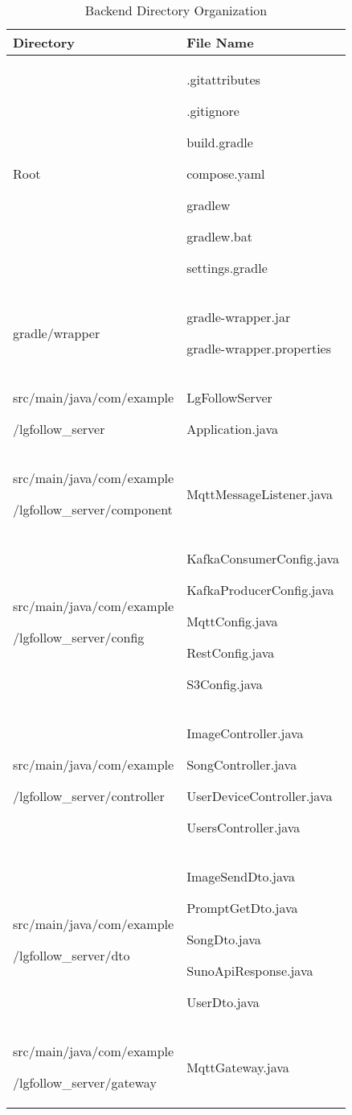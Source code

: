 \documentclass[conference]{IEEEtran}
\begin{document}
\begin{table}[h!]
\caption{Backend Directory Organization}
\def\arraystretch{1.4} \small
    \begin{tabular}{|p{4.1cm}|p{4.1cm}|}
        \hline
        \textbf{Directory} & \textbf{File Name} \\ \hline
        Root & .gitattributes \par .gitignore 
        \par build.gradle
        \par compose.yaml
        \par gradlew \par gradlew.bat \par settings.gradle\\ \hline
        gradle/wrapper& gradle-wrapper.jar \par gradle-wrapper.properties\\ \hline
        src/main/java/com/example  \par /lgfollow\_server & LgFollowServer\par Application.java \\ \hline
        src/main/java/com/example \par /lgfollow\_server/component & MqttMessageListener.java \\ \hline
        src/main/java/com/example \par /lgfollow\_server/config & KafkaConsumerConfig.java \par KafkaProducerConfig.java \par MqttConfig.java \par RestConfig.java \par S3Config.java \\ \hline
        src/main/java/com/example \par /lgfollow\_server/controller & ImageController.java \par SongController.java \par UserDeviceController.java \par UsersController.java \\ \hline
        src/main/java/com/example\par /lgfollow\_server/dto & ImageSendDto.java \par PromptGetDto.java \par SongDto.java \par SunoApiResponse.java \par UserDto.java \\ \hline
        src/main/java/com/example \par /lgfollow\_server/gateway & MqttGateway.java \\ \hline

\end{tabular}
\end{table}
\end{document}
